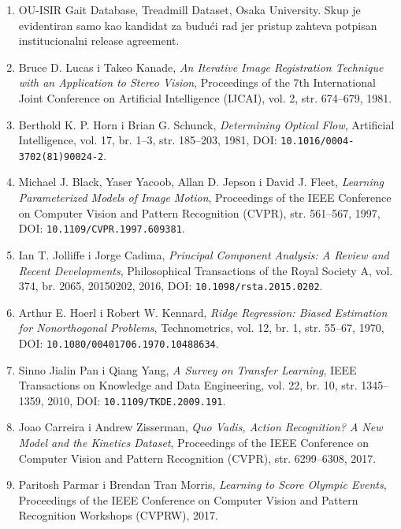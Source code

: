 \documentclass[12pt,a4paper]{report}
\begin{document}
\begin{enumerate}
  \item OU-ISIR Gait Database, Treadmill Dataset, Osaka University. Skup je
  evidentiran samo kao kandidat za budući rad jer pristup zahteva potpisan
  institucionalni release agreement.

  \item Bruce D. Lucas i Takeo Kanade, \textit{An Iterative Image Registration
  Technique with an Application to Stereo Vision}, Proceedings of the 7th
  International Joint Conference on Artificial Intelligence (IJCAI), vol. 2,
  str. 674--679, 1981.

  \item Berthold K. P. Horn i Brian G. Schunck, \textit{Determining Optical Flow},
  Artificial Intelligence, vol. 17, br. 1--3, str. 185--203, 1981,
  DOI: \texttt{10.1016/0004-3702(81)90024-2}.

  \item Michael J. Black, Yaser Yacoob, Allan D. Jepson i David J. Fleet,
  \textit{Learning Parameterized Models of Image Motion}, Proceedings of the
  IEEE Conference on Computer Vision and Pattern Recognition (CVPR),
  str. 561--567, 1997, DOI: \texttt{10.1109/CVPR.1997.609381}.

  \item Ian T. Jolliffe i Jorge Cadima, \textit{Principal Component Analysis:
  A Review and Recent Developments}, Philosophical Transactions of the Royal
  Society A, vol. 374, br. 2065, 20150202, 2016,
  DOI: \texttt{10.1098/rsta.2015.0202}.

  \item Arthur E. Hoerl i Robert W. Kennard, \textit{Ridge Regression: Biased
  Estimation for Nonorthogonal Problems}, Technometrics, vol. 12, br. 1,
  str. 55--67, 1970, DOI: \texttt{10.1080/00401706.1970.10488634}.

  \item Sinno Jialin Pan i Qiang Yang, \textit{A Survey on Transfer Learning},
  IEEE Transactions on Knowledge and Data Engineering, vol. 22, br. 10,
  str. 1345--1359, 2010, DOI: \texttt{10.1109/TKDE.2009.191}.

  \item Joao Carreira i Andrew Zisserman, \textit{Quo Vadis, Action Recognition?
  A New Model and the Kinetics Dataset}, Proceedings of the IEEE Conference on
  Computer Vision and Pattern Recognition (CVPR), str. 6299--6308, 2017.

  \item Paritosh Parmar i Brendan Tran Morris, \textit{Learning to Score Olympic
  Events}, Proceedings of the IEEE Conference on Computer Vision and Pattern
  Recognition Workshops (CVPRW), 2017.


\end{enumerate}
\end{document}
